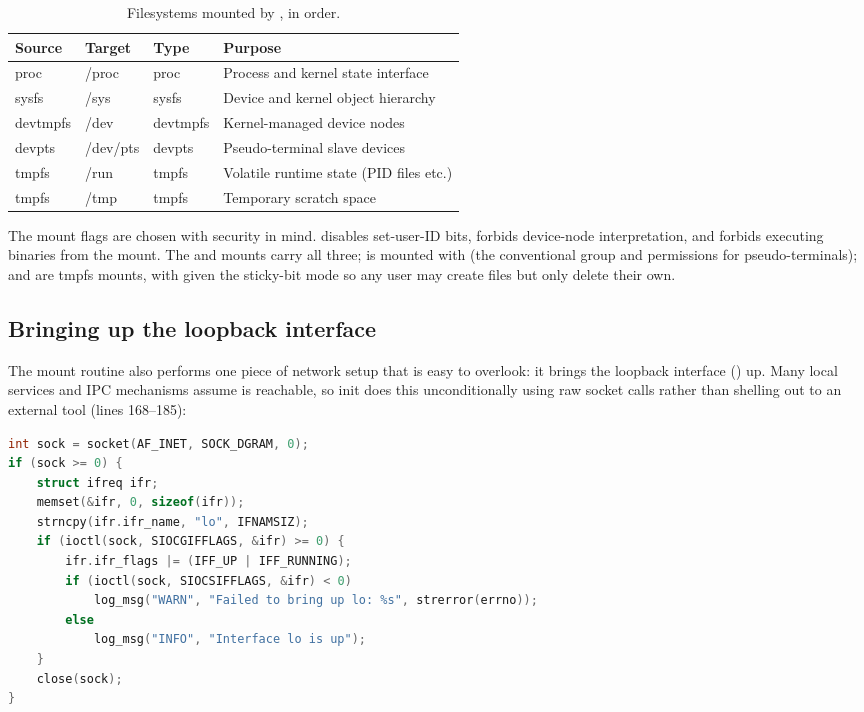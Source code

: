\begin{table}[h]
\centering
\caption{Filesystems mounted by , in order.}
\label{tab:init-mounts}
\small
\begin{tabular}{@{}llll@{}}
\toprule
\textbf{Source} & \textbf{Target} & \textbf{Type} & \textbf{Purpose} \\
\midrule
proc     & /proc    & proc     & Process and kernel state interface \\
sysfs    & /sys     & sysfs    & Device and kernel object hierarchy \\
devtmpfs & /dev     & devtmpfs & Kernel-managed device nodes \\
devpts   & /dev/pts & devpts   & Pseudo-terminal slave devices \\
tmpfs    & /run     & tmpfs    & Volatile runtime state (PID files etc.) \\
tmpfs    & /tmp     & tmpfs    & Temporary scratch space \\
\bottomrule
\end{tabular}
\end{table}

The mount flags are chosen with security in mind.  disables
set-user-ID bits,  forbids device-node interpretation, and
 forbids executing binaries from the mount. The  and
 mounts carry all three;  is mounted
 with  (the conventional 
group and permissions for pseudo-terminals);  and  are
 tmpfs mounts, with  given the sticky-bit mode
 so any user may create files but only delete their own.

\subsection{Bringing up the loopback interface}

The mount routine also performs one piece of network setup that is easy to
overlook: it brings the loopback interface () up. Many local services
and IPC mechanisms assume  is reachable, so init does this
unconditionally using raw  socket calls rather than shelling out to
an external tool (lines 168--185):

\begin{lstlisting}[language=C, caption={Activating the loopback interface via ioctl}]
int sock = socket(AF_INET, SOCK_DGRAM, 0);
if (sock >= 0) {
    struct ifreq ifr;
    memset(&ifr, 0, sizeof(ifr));
    strncpy(ifr.ifr_name, "lo", IFNAMSIZ);
    if (ioctl(sock, SIOCGIFFLAGS, &ifr) >= 0) {
        ifr.ifr_flags |= (IFF_UP | IFF_RUNNING);
        if (ioctl(sock, SIOCSIFFLAGS, &ifr) < 0)
            log_msg("WARN", "Failed to bring up lo: %s", strerror(errno));
        else
            log_msg("INFO", "Interface lo is up");
    }
    close(sock);
}
\end{lstlisting}

